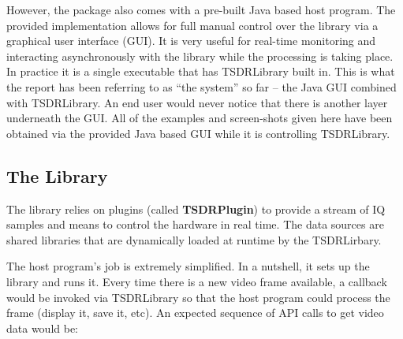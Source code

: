\documentclass[a4paper,12pt,twoside,openright]{report}
\begin{document}
However, the package also comes with a pre-built Java based host program. The provided implementation allows for full manual control over the library via a graphical user interface (GUI). It is very useful for real-time monitoring and interacting asynchronously with the library while the processing is taking place. In practice it is a single executable that has TSDRLibrary built in. This is what the report has been referring to as ``the system'' so far -- the Java GUI combined with TSDRLibrary. An end user would never notice that there is another layer underneath the GUI. All of the examples and screen-shots given here have been obtained via the provided Java based GUI while it is controlling TSDRLibrary.

\subsection{The Library}

The library relies on plugins (called \textbf{TSDRPlugin}) to provide a stream of IQ samples and means to control the hardware in real time. The data sources are shared libraries that are dynamically loaded at runtime by the TSDRLirbary.

The host program's job is extremely simplified. In a nutshell, it sets up the library and runs it. Every time there is a new video frame available, a callback would be invoked via TSDRLibrary so that the host program could process the frame (display it, save it, etc). An expected sequence of API calls to get video data would be:
\end{document}
